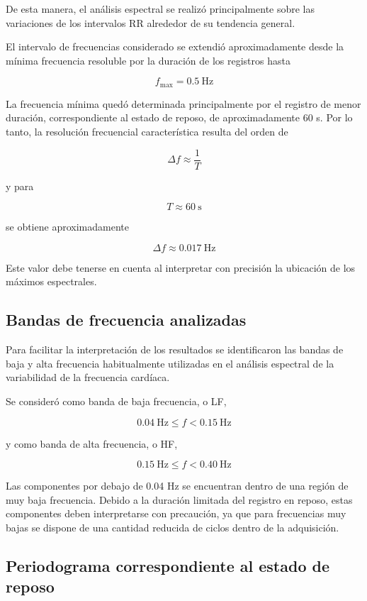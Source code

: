\documentclass[12pt,a4paper]{article}
\begin{document}
De esta manera, el análisis espectral se realizó principalmente sobre las
variaciones de los intervalos RR alrededor de su tendencia general.

El intervalo de frecuencias considerado se extendió aproximadamente desde la
mínima frecuencia resoluble por la duración de los registros hasta

\[
f_{\mathrm{max}} = 0.5~\mathrm{Hz}
\]

La frecuencia mínima quedó determinada principalmente por el registro de menor
duración, correspondiente al estado de reposo, de aproximadamente 60 s. Por lo
tanto, la resolución frecuencial característica resulta del orden de

\[
\Delta f \approx \frac{1}{T}
\]

y para

\[
T \approx 60~\mathrm{s}
\]

se obtiene aproximadamente

\[
\Delta f \approx 0.017~\mathrm{Hz}
\]

Este valor debe tenerse en cuenta al interpretar con precisión la ubicación de
los máximos espectrales.

\subsection{Bandas de frecuencia analizadas}

Para facilitar la interpretación de los resultados se identificaron las bandas
de baja y alta frecuencia habitualmente utilizadas en el análisis espectral de
la variabilidad de la frecuencia cardíaca.

Se consideró como banda de baja frecuencia, o LF,

\[
0.04~\mathrm{Hz} \leq f < 0.15~\mathrm{Hz}
\]

y como banda de alta frecuencia, o HF,

\[
0.15~\mathrm{Hz} \leq f < 0.40~\mathrm{Hz}
\]

Las componentes por debajo de 0.04 Hz se encuentran dentro de una región de muy
baja frecuencia. Debido a la duración limitada del registro en reposo, estas
componentes deben interpretarse con precaución, ya que para frecuencias muy
bajas se dispone de una cantidad reducida de ciclos dentro de la adquisición.

\subsection{Periodograma correspondiente al estado de reposo}
\end{document}
